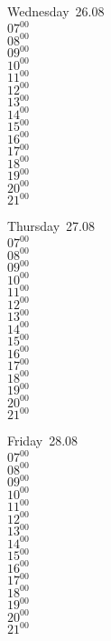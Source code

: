 \documentclass[11pt,a4paper]{book}\usepackage[]{graphicx}\usepackage[]{color}
\begin{document}
\begin{weekdaybox}
  Wednesday~26.08\\
  { 
  \vfill
  $07^{00}$\\
$08^{00}$\\
$09^{00}$\\
$10^{00}$\\
$11^{00}$\\
$12^{00}$\\
$13^{00}$\\
$14^{00}$\\
$15^{00}$\\
$16^{00}$\\
$17^{00}$\\
$18^{00}$\\
$19^{00}$\\
$20^{00}$\\
$21^{00}$\\
  }
\end{weekdaybox}
\clearpage
\begin{headerbox}
\end{headerbox}
\begin{weekdaybox}
  Thursday~27.08\\
  { 
  \vfill
  $07^{00}$\\
$08^{00}$\\
$09^{00}$\\
$10^{00}$\\
$11^{00}$\\
$12^{00}$\\
$13^{00}$\\
$14^{00}$\\
$15^{00}$\\
$16^{00}$\\
$17^{00}$\\
$18^{00}$\\
$19^{00}$\\
$20^{00}$\\
$21^{00}$\\
  }
\end{weekdaybox} 
\begin{weekdaybox}
  Friday~28.08\\
  { 
  \vfill
  $07^{00}$\\
$08^{00}$\\
$09^{00}$\\
$10^{00}$\\
$11^{00}$\\
$12^{00}$\\
$13^{00}$\\
$14^{00}$\\
$15^{00}$\\
$16^{00}$\\
$17^{00}$\\
$18^{00}$\\
$19^{00}$\\
$20^{00}$\\
$21^{00}$\\
  }
\end{weekdaybox}
\end{document}
